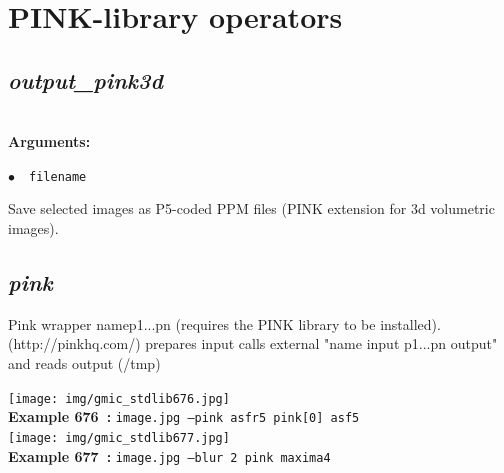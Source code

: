 \documentclass[a4paper,10.5pt,twoside]{book}
\def\comma{\discretionary{,}{}{,}}
\newcommand{\Cb}[1]{\textcolor{cb}{#1}}
\begin{document}
\section{PINK-library operators}


\subsection{\emph{output\_pink3d} }\vspace*{-0.7em}
~\\\textbf{\Cb{Arguments: }}\begin{flushleft}
{\small \Cb{\hspace*{0.5cm}$\bullet$~~\texttt{filename}}}\end{flushleft}
Save selected images as P5-coded PPM files (PINK extension for 3d volumetric images).


\subsection{\emph{pink} }\vspace*{-0.7em}
Pink wrapper name{\comma}p1{\comma}...{\comma}pn (requires the PINK library to be installed).
~\\(http://pinkhq.com/)
prepares input{\comma} calls external "name input p1...pn output" and reads output (/tmp)
\begin{center}\texttt{[image: img/gmic\_stdlib676.jpg]}\\
{\footnotesize \textbf{Example 676~:} \texttt{image.jpg --pink asfr{\comma}5 pink[0] asf{\comma}5}}
\\\texttt{[image: img/gmic\_stdlib677.jpg]}\\
{\footnotesize \textbf{Example 677~:} \texttt{image.jpg --blur 2 pink maxima{\comma}4}}
\end{center}
\end{document}
